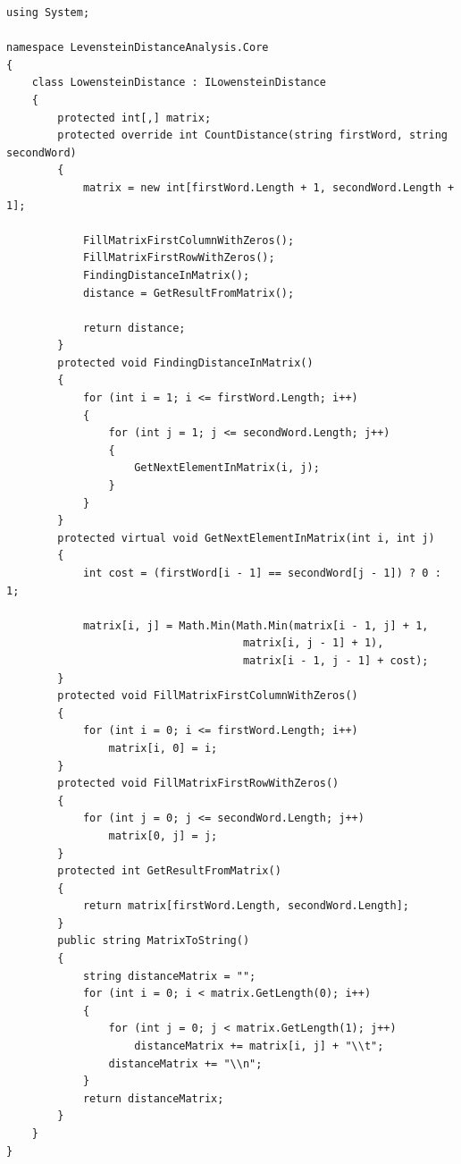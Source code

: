 \documentclass[12pt]{report}
\begin{document}
\begin{lstlisting}[label=some-code,caption=Класс для нахождения расстояния Левенштейна]
using System;

namespace LevensteinDistanceAnalysis.Core
{
    class LowensteinDistance : ILowensteinDistance
    {
        protected int[,] matrix;
        protected override int CountDistance(string firstWord, string secondWord)
        {
            matrix = new int[firstWord.Length + 1, secondWord.Length + 1];

            FillMatrixFirstColumnWithZeros();
            FillMatrixFirstRowWithZeros();
            FindingDistanceInMatrix();
            distance = GetResultFromMatrix();

            return distance;
        }
        protected void FindingDistanceInMatrix()
        {
            for (int i = 1; i <= firstWord.Length; i++)
            {
                for (int j = 1; j <= secondWord.Length; j++)
                {
                    GetNextElementInMatrix(i, j);
                }
            }
        }
        protected virtual void GetNextElementInMatrix(int i, int j)
        {
            int cost = (firstWord[i - 1] == secondWord[j - 1]) ? 0 : 1;

            matrix[i, j] = Math.Min(Math.Min(matrix[i - 1, j] + 1,
                                     matrix[i, j - 1] + 1),
                                     matrix[i - 1, j - 1] + cost);
        }
        protected void FillMatrixFirstColumnWithZeros()
        {
            for (int i = 0; i <= firstWord.Length; i++)
                matrix[i, 0] = i;
        }
        protected void FillMatrixFirstRowWithZeros()
        {
            for (int j = 0; j <= secondWord.Length; j++)
                matrix[0, j] = j;
        }
        protected int GetResultFromMatrix()
        {
            return matrix[firstWord.Length, secondWord.Length];
        }
        public string MatrixToString()
        {
            string distanceMatrix = "";
            for (int i = 0; i < matrix.GetLength(0); i++)
            {
                for (int j = 0; j < matrix.GetLength(1); j++)
                    distanceMatrix += matrix[i, j] + "\\t";
                distanceMatrix += "\\n";
            }
            return distanceMatrix;
        }
    }
}

\end{lstlisting}
\end{document}
